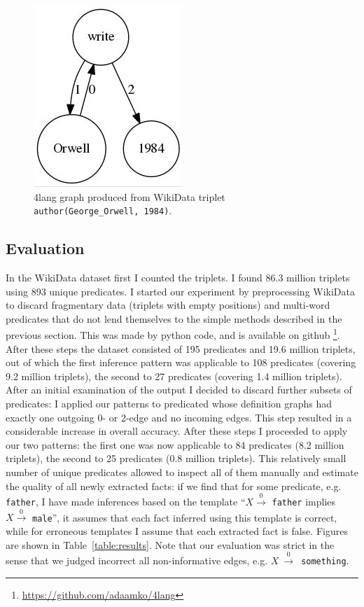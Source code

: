 \begin{figure}
	\centering
	\includegraphics[scale=0.5]{figures/orwell_inf.jpg}
	\caption{4lang graph produced from WikiData triplet
		\texttt{author(George\_Orwell, 1984)}.}
	\label{fig:orwell_inf}
\end{figure}

\subsection{Evaluation}

In the WikiData dataset first I counted the triplets. I found 86.3 million triplets using 893 unique predicates.
I started our experiment by preprocessing WikiData to discard fragmentary data
(triplets with empty positions) and multi-word predicates that do not lend themselves
to the simple methods described in the previous section. This was made by python code, and is available on github \footnote{\url{https://github.com/adaamko/4lang}}.
After these steps the dataset consisted of 195 predicates and 19.6 million triplets,
out of which the first inference pattern was applicable to 108 predicates
(covering 9.2 million triplets), the second to 27 predicates (covering 1.4 million triplets).
After an initial examination of the output I decided to discard further subsets
of predicates: I applied our patterns to predicated whose definition graphs had exactly one outgoing
0- or 2-edge and no incoming edges. This step resulted in a considerable increase in
overall accuracy. After these steps I proceeded to apply our two patterns: the first one was
now applicable to 84 predicates (8.2 million triplets), the second to 25 predicates (0.8 million triplets).
This relatively small number of unique predicates allowed to inspect all of them manually and estimate the quality of all newly
extracted facts: if we find that for some predicate, e.g. \texttt{father}, I
have made inferences based on the template ``$X \xrightarrow0$ \texttt{father}
implies $X \xrightarrow0$ \texttt{male}'', it assumes that each fact inferred
using this template is correct, while for erroneous templates I assume that
each extracted fact is false. Figures are shown in Table~\ref{table:results}.
Note that our evaluation
was strict in the sense that we judged incorrect all non-informative edges, e.g.
$X~\xrightarrow0$~\texttt{something}.

